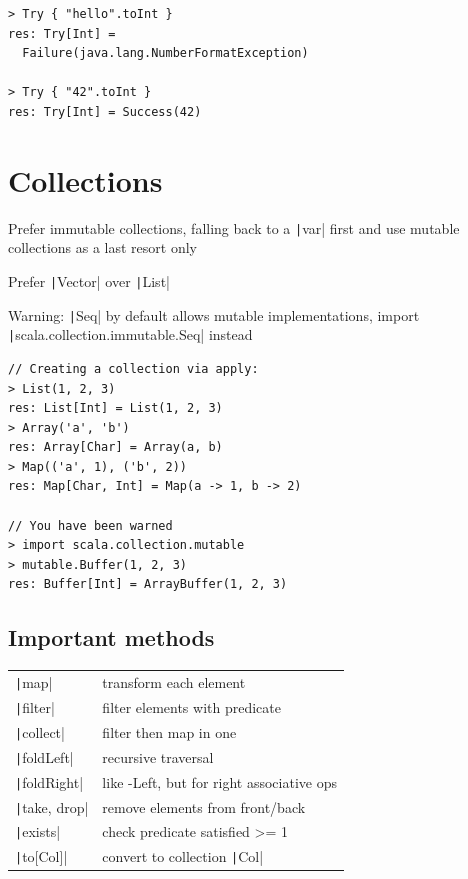 \documentclass[10pt,landscape,a4paper]{article}
\begin{document}
\begin{multicols*}{4}
\begin{verbatim}
> Try { "hello".toInt }
res: Try[Int] =
  Failure(java.lang.NumberFormatException)

> Try { "42".toInt }
res: Try[Int] = Success(42)
\end{verbatim}

  \section{Collections}

  \begin{mdframed}
    \footnotesize

    \par Prefer immutable collections, falling back to a
    \texttt|var| first and use mutable collections as a
    last resort only \\

    \par Prefer \texttt|Vector| over
    \texttt|List| \\

    \par \textcolor{myred!120}{Warning:}
    \texttt|Seq| by default allows mutable
    implementations, import
    \texttt|scala.collection.immutable.Seq| instead
  \end{mdframed}

\begin{verbatim}
// Creating a collection via apply:
> List(1, 2, 3)
res: List[Int] = List(1, 2, 3)
> Array('a', 'b')
res: Array[Char] = Array(a, b)
> Map(('a', 1), ('b', 2))
res: Map[Char, Int] = Map(a -> 1, b -> 2)

// You have been warned
> import scala.collection.mutable
> mutable.Buffer(1, 2, 3)
res: Buffer[Int] = ArrayBuffer(1, 2, 3)
\end{verbatim}

  \subsection{Important methods}

  \begin{tabular}{l p{5cm}}
    \texttt|map| & transform each element \\
    \texttt|filter| & filter elements with predicate \\
    \texttt|collect| & filter then map in one \\
    \texttt|foldLeft| & recursive traversal \\
    \texttt|foldRight| & like -Left, but for right associative ops \\
    \texttt|take, drop| & remove elements from front/back \\
    \texttt|exists| & check predicate satisfied >= 1 \\
    \texttt|to[Col]| & convert to collection \texttt|Col|
  \end{tabular}


\end{multicols*}
\end{document}
